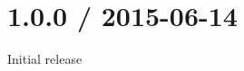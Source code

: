 \chapter{1.0.0 / 2015-\/06-\/14}
\hypertarget{md_Dashboard_2node__modules_2unpipe_2HISTORY}{}\label{md_Dashboard_2node__modules_2unpipe_2HISTORY}

\begin{DoxyItemize}
\item Initial release 
\end{DoxyItemize}
